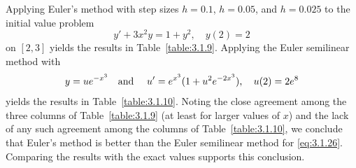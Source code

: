 \begin{example}
  {\color{blue}}\label{example:3.1.6} \rm Applying Euler's method with step sizes $h=0.1$, $h=0.05$,
  and $h=0.025$ to the initial value problem
  \begin{equation}
    \label{eq:3.1.26}y'+3x^{2}y=1+y^{2},\quad y(2)=2
  \end{equation}
  on $[2,3]$ yields the results in Table~\ref{table:3.1.9}. Applying the Euler semilinear method
  with
  \[
    y=ue^{-x^{3}}\mbox{\quad and \quad}u'=e^{x^{3}}(1+u^{2}e^{-2x^{3}}),\quad u(2)=2e^{8}
  \]
  yields the results in Table~\ref{table:3.1.10}. Noting the close agreement among the three columns
  of Table~\ref{table:3.1.9} (at least for larger values of $x$) and the lack of any such agreement
  among the columns of Table~\ref{table:3.1.10}, we conclude that Euler's method is better than the
  Euler semilinear method for \eqref{eq:3.1.26}. Comparing the results with the exact values
  supports this conclusion.
\end{example}

